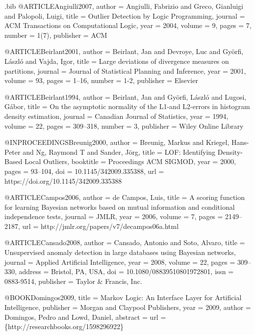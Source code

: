 {\begin{filecontents}{\jobname.bib}
@ARTICLE{Angiulli2007,
  author = {Angiulli, Fabrizio and Greco, Gianluigi and Palopoli, Luigi},
  title = {Outlier Detection by Logic Programming},
  journal = {ACM Transactions on Computational Logic},
  year = {2004},
  volume = {9},
  pages = {7},
  number = {1(7)},
  publisher = {ACM}
}

@ARTICLE{Beirlant2001,
  author = {Beirlant, Jan and Devroye, Luc and Gy{\"{o}}rfi, L{\'{a}}szl{\'{o}}
	and Vajda, Igor},
  title = {Large deviations of divergence measures on partitions},
  journal = {Journal of Statistical Planning and Inference},
  year = {2001},
  volume = {93},
  pages = {1--16},
  number = {1-2},
  publisher = {Elsevier}
}

@ARTICLE{Beirlant1994,
  author = {Beirlant, Jan and Gy{\"{o}}rfi, L{\'{a}}szl{\'{o}} and Lugosi, G{\'{a}}bor},
  title = {On the asymptotic normality of the {L}1-and {L}2-errors in histogram density estimation},
  journal = {Canadian Journal of Statistics},
  year = {1994},
  volume = {22},
  pages = {309--318},
  number = {3},
  publisher = {Wiley Online Library}
}

@INPROCEEDINGS{Breunig2000,
  author = {Breunig, Markus and Kriegel, Hans-Peter and Ng, Raymond T and Sander,
	J\"org},
  title = {LOF: Identifying Density-Based Local Outliers},
  booktitle = {Proceedings ACM SIGMOD},
  year = {2000},
  pages = {93--104},
  doi = {10.1145/342009.335388},
  url = {https://doi.org/10.1145/342009.335388}
}

@ARTICLE{Campos2006,
  author = {de Campos, Luis},
  title = {A scoring function for learning {Bayesian }networks based
	on mutual information and conditional independence tests},
  journal = {JMLR},
  year = {2006},
  volume = {7},
  pages = {2149--2187},
  url = {http://jmlr.org/papers/v7/decampos06a.html}
}

@ARTICLE{Cansado2008,
  author = {Cansado, Antonio and Soto, Alvaro},
  title = {Unsupervised anomaly detection in large databases using {Bayesian} networks},
  journal = {Applied Artificial Intelligence},
  year = {2008},
  volume = {22},
  pages = {309--330},
  address = {Bristol, PA, USA},
  doi = {10.1080/08839510801972801},
  issn = {0883-9514},
  publisher = {Taylor {\&} Francis, Inc.}
}

@BOOK{Domingos2009,
  title = {Markov Logic: An Interface Layer for Artificial Intelligence},
  publisher = {Morgan and Claypool Publishers},
  year = {2009},
  author = {Domingos, Pedro and Lowd, Daniel},
  abstract = {url = {\{}http://researchbooks.org/1598296922{\}}}
}


\end{filecontents}}
